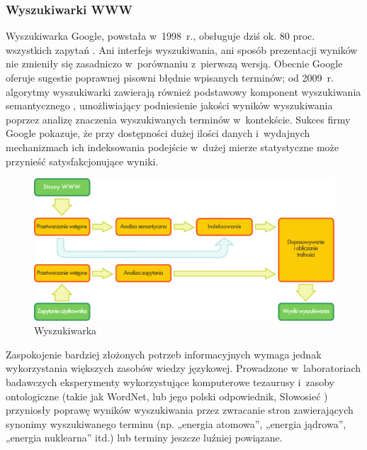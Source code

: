 \begin{multicols}{2}
\subsubsection[Wyszukiwarki WWW]{Wyszukiwarki WWW} Wyszukiwarka
Google, powstała w~1998~r., obsługuje dziś ok. 80 proc. wszystkich
zapytań \cite{spi1}. Ani interfejs wyszukiwania, ani sposób
prezentacji wyników nie zmieniły się zasadniczo w~porównaniu
z~pierwszą wersją. Obecnie Google oferuje sugestie poprawnej pisowni
błędnie wpisanych terminów; od 2009~r. algorytmy wyszukiwarki
zawierają również podstawowy komponent wyszukiwania semantycznego
\cite{pc1}, umożliwiający podniesienie jakości wyników
wyszukiwania poprzez analizę znaczenia wyszukiwanych terminów
w~kontekście. Sukces firmy Google pokazuje, że przy dostępności
dużej ilości danych i~wydajnych mechanizmach ich indeksowania
podejście w~dużej mierze statystyczne może przynieść
satysfakcjonujące wyniki. 

\begin{figure}[htb]  \center
\includegraphics[width=\textwidth]{../_media/polish/web_search_architecture}
\caption{Wyszukiwarka} \label{fig: websearcharch_pl}
 \end{figure} 

Zaspokojenie bardziej złożonych potrzeb informacyjnych wymaga jednak
wykorzystania większych zasobów wiedzy językowej. Prowadzone
w~laboratoriach badawczych eksperymenty wykorzystujące komputerowe
tezaurusy i~zasoby ontologiczne (takie jak WordNet, lub jego polski
odpowiednik, Słowosieć \cite{Slowosiec1, Piasecki2009}) przyniosły
poprawę wyników wyszukiwania przez zwracanie stron zawierających
synonimy wyszukiwanego terminu (np. „energia atomowa”, „energia
jądrowa”, „energia nuklearna” itd.) lub terminy jeszcze
luźniej powiązane. 



\end{multicols}
